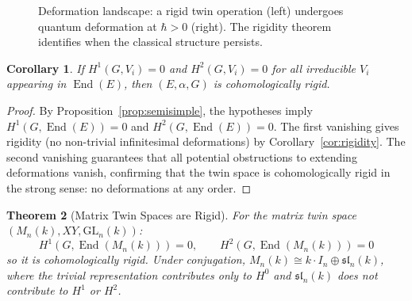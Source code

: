 \documentclass[11pt,a4paper,openany]{book}
\theoremstyle{plain}
\newtheorem{theorem}{Theorem}[chapter]
\newtheorem{corollary}[theorem]{Corollary}
\theoremstyle{definition}
\newcommand{\actspace}{E}
\newcommand{\groupG}{G}
\newcommand{\GL}{\mathrm{GL}}
\DeclareMathOperator{\End}{End}
\begin{document}
\begin{figure}[ht]
\centering
{}
\caption{Deformation landscape: a rigid twin operation (left) undergoes quantum deformation at $\hbar > 0$ (right). The rigidity theorem identifies when the classical structure persists.}
\label{fig:deformation-landscape}
\end{figure}


\begin{corollary}\label{cor:representation-rigidity}
If $H^1(\groupG, V_i) = 0$ and $H^2(\groupG, V_i) = 0$ for all irreducible $V_i$ appearing in $\End(\actspace)$, then $(\actspace, \alpha, \groupG)$ is cohomologically rigid.
\end{corollary}

\begin{proof}
By Proposition~\ref{prop:semisimple}, the hypotheses imply $H^1(\groupG, \End(\actspace)) = 0$ and $H^2(\groupG, \End(\actspace)) = 0$. The first vanishing gives rigidity (no non-trivial infinitesimal deformations) by Corollary~\ref{cor:rigidity}. The second vanishing guarantees that all potential obstructions to extending deformations vanish, confirming that the twin space is cohomologically rigid in the strong sense: no deformations at any order.
\end{proof}

\begin{theorem}[Matrix Twin Spaces are Rigid]\label{thm:matrix-rigid}
For the matrix twin space $(M_n(k), XY, \GL_n(k))$:
\[
H^1(\groupG, \End(M_n(k))) = 0, \qquad H^2(\groupG, \End(M_n(k))) = 0
\]
so it is cohomologically rigid. Under conjugation, $M_n(k) \cong k \cdot I_n \oplus \mathfrak{sl}_n(k)$, where the trivial representation contributes only to $H^0$ and $\mathfrak{sl}_n(k)$ does not contribute to $H^1$ or $H^2$.
\end{theorem}
\end{document}
